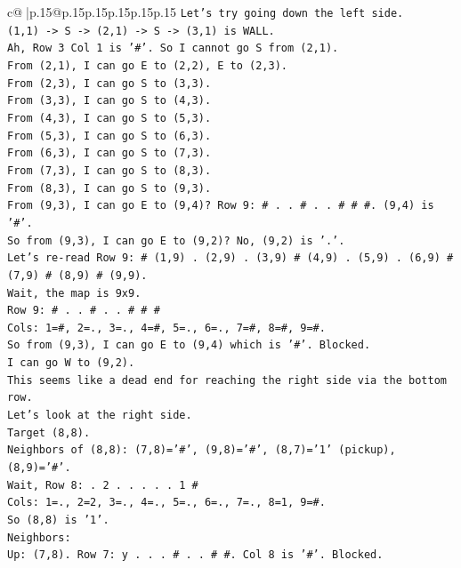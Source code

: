 \documentclass{article}
\begin{document}
{\begin{supertabular}{c@{$\;$}|p{.15\linewidth}@{}p{.15\linewidth}p{.15\linewidth}p{.15\linewidth}p{.15\linewidth}p{.15\linewidth}}
{{{\texttt{Let's try going down the left side.} \\
\texttt{(1,1) {-}> S {-}> (2,1) {-}> S {-}> (3,1) is WALL.} \\
\texttt{Ah, Row 3 Col 1 is '\#'. So I cannot go S from (2,1).} \\
\texttt{From (2,1), I can go E to (2,2), E to (2,3).} \\
\texttt{From (2,3), I can go S to (3,3).} \\
\texttt{From (3,3), I can go S to (4,3).} \\
\texttt{From (4,3), I can go S to (5,3).} \\
\texttt{From (5,3), I can go S to (6,3).} \\
\texttt{From (6,3), I can go S to (7,3).} \\
\texttt{From (7,3), I can go S to (8,3).} \\
\texttt{From (8,3), I can go S to (9,3).} \\
\texttt{From (9,3), I can go E to (9,4)? Row 9: \# . . \# . . \# \# \#. (9,4) is '\#'.} \\
\texttt{So from (9,3), I can go E to (9,2)? No, (9,2) is '.'.} \\
\texttt{Let's re{-}read Row 9: \# (1,9) . (2,9) . (3,9) \# (4,9) . (5,9) . (6,9) \# (7,9) \# (8,9) \# (9,9).} \\
\texttt{Wait, the map is 9x9.} \\
\texttt{Row 9: \# . . \# . . \# \# \#} \\
\texttt{Cols: 1=\#, 2=., 3=., 4=\#, 5=., 6=., 7=\#, 8=\#, 9=\#.} \\
\texttt{So from (9,3), I can go E to (9,4) which is '\#'. Blocked.} \\
\texttt{I can go W to (9,2).} \\
\texttt{This seems like a dead end for reaching the right side via the bottom row.} \\
\texttt{Let's look at the right side.} \\
\texttt{Target (8,8).} \\
\texttt{Neighbors of (8,8): (7,8)='\#', (9,8)='\#', (8,7)='1' (pickup), (8,9)='\#'.} \\
\texttt{Wait, Row 8: . 2 . . . . . 1 \#} \\
\texttt{Cols: 1=., 2=2, 3=., 4=., 5=., 6=., 7=., 8=1, 9=\#.} \\
\texttt{So (8,8) is '1'.} \\
\texttt{Neighbors:} \\
\texttt{Up: (7,8). Row 7: y . . . \# . . \# \#. Col 8 is '\#'. Blocked.} \\
}}}
\end{supertabular}}
\end{document}
